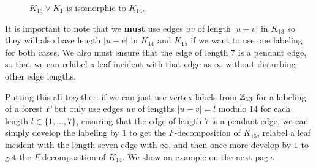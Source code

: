 \begin{figure}[H]
\begin{center}
  \end{center}
  \caption{$K_{13}\vee K_{1}$ is isomorphic to $K_{14}$.}
  \label{fig:K13infty}
\end{figure}

\noindent It is important to note that we \textbf{must} use edges $uv$ of length $|u-v|$ in $K_{13}$ so they will also have length $|u-v|$ in $K_{14}$ and $K_{15}$ if we want to use one labeling for both cases. We also must ensure that the edge of length $7$ is a pendant edge, so that we can relabel a leaf incident with that edge as $\infty$ without disturbing other edge lengths.

Putting this all together: if we can just use vertex labels from $\mathbb{Z}_{13}$ for a labeling of a forest $F$ but only use edges $uv$ of lengths $|u-v|=l$ modulo $14$ for each length $l\in \{1,\hdots,7\}$, ensuring that the edge of length $7$ is a pendant edge, we can simply develop the labeling by $1$ to get the $F$-decomposition of $K_{15}$, relabel a leaf incident with the length seven edge with $\infty$, and then once more develop by $1$ to get the $F$-decomposition of $K_{14}$. We show an example on the next page.

